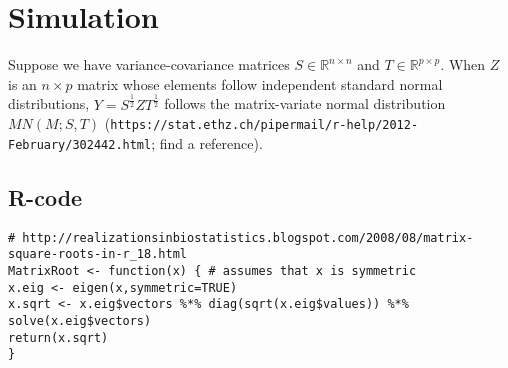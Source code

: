 \documentclass[12pt]{article}
\newcommand{\R}{\mathbb{R}}
\begin{document}
\section{Simulation}

Suppose we have variance-covariance matrices $S \in \R^{n \times n}$ and $T \in \R^{p \times p}$.
When $Z$ is an $n \times p$ matrix whose elements follow independent standard normal distributions, $Y = S^{\frac{1}{2}} Z T^{\frac{1}{2}}$ follows
the matrix-variate normal distribution $MN(M; S, T)$ (\verb|https://stat.ethz.ch/pipermail/r-help/2012-February/302442.html|; find a reference).

\subsection{R-code}

\begin{verbatim}
# http://realizationsinbiostatistics.blogspot.com/2008/08/matrix-square-roots-in-r_18.html
MatrixRoot <- function(x) { # assumes that x is symmetric
x.eig <- eigen(x,symmetric=TRUE)
x.sqrt <- x.eig$vectors %*% diag(sqrt(x.eig$values)) %*% solve(x.eig$vectors)
return(x.sqrt)
}
\end{verbatim}



\end{document}
